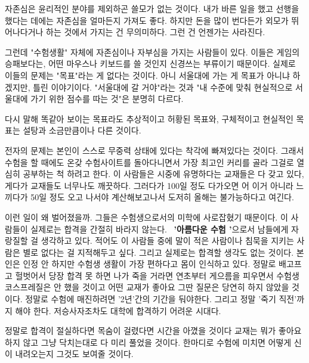 자존심은 윤리적인 분야를 제외하곤 쓸모가 없는 것이다.
내가 바른 일을 했고 선행을 했다는 데에는 자존심을 얼마든지 가져도 좋다.
하지만 돈을 많이 번다든가 외모가 뛰어나다거나 하는 것에서 가지는 건 무의미하다. 그런 건 언젠가는 사라진다.
\vspace{5mm}

그런데 "수험생활" 자체에 자존심이나 자부심을 가지는 사람들이 있다.
이들은 게임의 승패보다는, 어떤 마우스나 키보드를 쓸 것인지 신경쓰는 부류이기 때문이다.
실제로 이들의 문제는 "목표"라는 게 없다는 것이다.
아니 서울대에 가는 게 목표가 아니냐 하겠지만, 틀린 이야기이다.
"서울대에 갈 거야"라는 것과 "내 수준에 맞춰 현실적으로 서울대에 가기 위한 점수를 따는 것"은 분명히 다르다.
\vspace{5mm}

다시 말해 똑같아 보이는 목표라도 추상적이고 허황된 목표와, 구체적이고 현실적인 목표는 설탕과 소금만큼이나 다른 것이다.
\vspace{5mm}

전자의 문제는 본인이 스스로 무중력 상태에 있다는 착각에 빠져있다는 것이다.
그래서 수험을 할 때에도 온갖 수험사이트를 돌아다니면서 가장 최고인 커리를 골라 그걸로 열심히 공부하는 척 하려고 한다.
이 사람들은 시중에 유명하다는 교재들은 다 갖고 있다, 게다가 교재들도 너무나도 깨끗하다.
그러다가 100일 정도 다가오면 어 이거 아니라 느끼다가 50일 정도 오고 나서야 계산해보고나서 도저히 올해는 불가능하다고 여긴다.
\vspace{5mm}

이런 일이 왜 벌어졌을까.
그들은 수험생으로서의 미학에 사로잡혔기 때문이다.
이 사람들이 실제로는 합격을 간절히 바라지 않는다.  \textbf{'아름다운 수험 '}으로서 남들에게 자랑질할 걸 생각하고 있다.
적어도 이 사람들 중에 말이 적은 사람이나 침묵을 지키는 사람은 별로 없다는 걸 지적해두고 싶다.
그리고 실제로는 합격할 생각도 없는 것이다. 본인은 인정 안 하지만 수험생 생활이 가장 편하다고 몸이 인식하고 있다.
정말로 배고프고 헐벗어서 당장 합격 못 하면 나가 죽을 거라면 연초부터 게으름을 피우면서 수험생 코스프레질은 안 했을 것이고
어떤 교재가 좋아요 그딴 질문은 당연히 하지 않았을 것이다.
정말로 수험에 매진하려면 '2년'간의 기간을 둬야한다. 그리고 정말 '죽기 직전'까지 해야 한다.
저승사자조차도 대학에 합격하기 어려운 시대다.
\vspace{5mm}

정말로 합격이 절실하다면 목숨이 걸렸다면 시간을 아꼈을 것이다
교재는 뭐가 좋아요 하지 않고 그냥 닥치는대로 다 미리 풀었을 것이다.
한마디로 수험에 미치면 어떻게 신이 내려오는지 그것도 보여줄 것이다.
\vspace{5mm}

